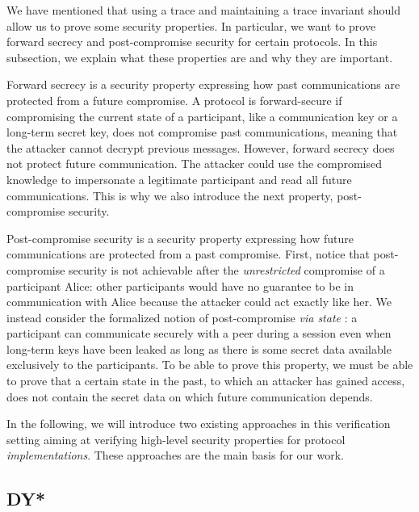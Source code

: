 We have mentioned that using a trace and maintaining a trace invariant should allow us to prove some security properties.
In particular, we want to prove forward secrecy and post-compromise security for certain protocols. In this subsection, we explain what these properties are and why they are important.

Forward secrecy is a security property expressing how past communications are protected from a future compromise.
A protocol is forward-secure if compromising the current state of a participant, like a communication key or a long-term secret key, does not compromise past communications, meaning that the attacker cannot decrypt previous messages.
However, forward secrecy does not protect future communication. The attacker could use the compromised knowledge to impersonate a legitimate participant and read all future communications.
This is why we also introduce the next property, post-compromise security.

Post-compromise security is a security property expressing how future communications are protected from a past compromise.
First, notice that post-compromise security is not achievable after the \emph{unrestricted} compromise of a participant Alice: other participants would have no guarantee to be in communication with Alice because the attacker could act exactly like her.
We instead consider the formalized notion of post-compromise \emph{via state} \cite{}:
a participant can communicate securely with a peer during a session even when long-term keys have been leaked as long as there is some secret data available exclusively to the participants.
To be able to prove this property, we must be able to prove that a certain state in the past, to which an attacker has gained access, does not contain the secret data on which future communication depends.

In the following, we will introduce two existing approaches in this verification setting aiming at verifying high-level security properties for protocol \emph{implementations}. These approaches are the main basis for our work.

\subsection{DY*}
\label{sec:dy-star}

